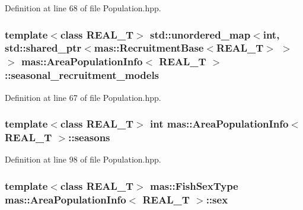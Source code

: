Definition at line 68 of file Population.\-hpp.

\hypertarget{structmas_1_1_area_population_info_a55b58b150ddfdd74d09247c2537a2d08}{
\subsubsection[{seasonal\-\_\-recruitment\-\_\-models}]{\setlength{\rightskip}{0pt plus 5cm}template$<$class R\-E\-A\-L\-\_\-\-T$>$ std\-::unordered\-\_\-map$<$int, std\-::shared\-\_\-ptr$<${\bf mas\-::\-Recruitment\-Base}$<$R\-E\-A\-L\-\_\-\-T$>$ $>$ $>$ {\bf mas\-::\-Area\-Population\-Info}$<$ R\-E\-A\-L\-\_\-\-T $>$\-::seasonal\-\_\-recruitment\-\_\-models}}\label{structmas_1_1_area_population_info_a55b58b150ddfdd74d09247c2537a2d08}


Definition at line 67 of file Population.\-hpp.

\hypertarget{structmas_1_1_area_population_info_ac7fc7361c1804c2d24a2c88931c75c0f}{
\subsubsection[{seasons}]{\setlength{\rightskip}{0pt plus 5cm}template$<$class R\-E\-A\-L\-\_\-\-T$>$ int {\bf mas\-::\-Area\-Population\-Info}$<$ R\-E\-A\-L\-\_\-\-T $>$\-::seasons}}\label{structmas_1_1_area_population_info_ac7fc7361c1804c2d24a2c88931c75c0f}


Definition at line 98 of file Population.\-hpp.

\hypertarget{structmas_1_1_area_population_info_a4eb0872d4ac95ec63d9134f5bc0fd29c}{
\subsubsection[{sex}]{\setlength{\rightskip}{0pt plus 5cm}template$<$class R\-E\-A\-L\-\_\-\-T$>$ {\bf mas\-::\-Fish\-Sex\-Type} {\bf mas\-::\-Area\-Population\-Info}$<$ R\-E\-A\-L\-\_\-\-T $>$\-::sex}}\label{structmas_1_1_area_population_info_a4eb0872d4ac95ec63d9134f5bc0fd29c}


